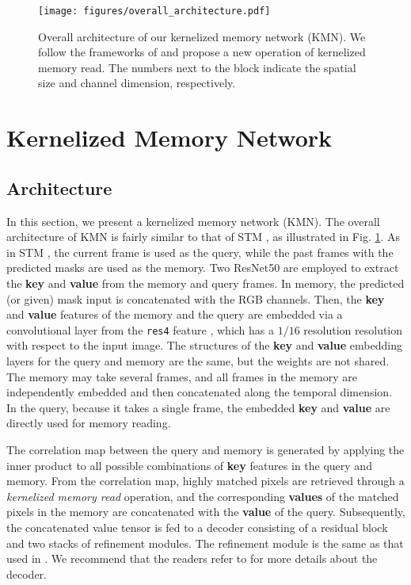 \documentclass[runningheads]{llncs}
\begin{document}
\begin{figure}[t]
\centering
\texttt{[image: figures/overall\_architecture.pdf]}
\caption{
Overall architecture of our kernelized memory network (KMN). We follow the frameworks of \cite{Oh_2019_ICCV} and propose a new operation of kernelized memory read. The numbers next to the block indicate the spatial size and channel dimension, respectively.
}
\label{fig:overall_architecture}
\end{figure}

\section{Kernelized Memory Network}
\label{s3}

\subsection{Architecture}
\label{s31}
In this section, we present a kernelized memory network (KMN). The overall architecture of KMN is fairly similar to that of STM \cite{Oh_2019_ICCV}, as illustrated in Fig. \ref{fig:overall_architecture}. As in STM \cite{Oh_2019_ICCV}, the current frame is used as the query, while the past frames with the predicted masks are used as the memory. Two ResNet50 \cite{b23} are employed to extract the \textbf{key} and \textbf{value} from the memory and query frames. In memory, the predicted (or given) mask input is concatenated with the RGB channels. Then, the \textbf{key} and \textbf{value} features of the memory and the query are embedded via a convolutional layer from the \texttt{res4} feature \cite{b23}, which has a $1/16$ resolution resolution with respect to the input image. The structures of the \textbf{key} and \textbf{value} embedding layers for the query and memory are the same, but the weights are not shared. The memory may take several frames, and all frames in the memory are independently embedded and then concatenated along the temporal dimension. In the query, because it takes a single frame, the embedded \textbf{key} and \textbf{value} are directly used for memory reading.

The correlation map between the query and memory is generated by applying the inner product to all possible combinations of \textbf{key} features in the query and memory. From the correlation map, highly matched pixels are retrieved through a \textit{kernelized memory read} operation, and the corresponding \textbf{values} of the matched pixels in the memory are concatenated with the \textbf{value} of the query. Subsequently, the concatenated value tensor is fed to a decoder consisting of a residual block \cite{he2016identity} and two stacks of refinement modules. The refinement module is the same as that used in \cite{Oh_2019_ICCV,wug2018fast}. We recommend that the readers refer to \cite{Oh_2019_ICCV} for more details about the decoder.
\end{document}
